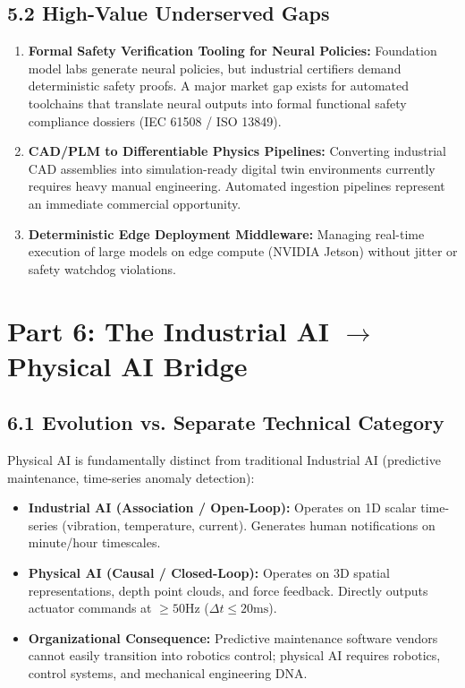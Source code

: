 \documentclass[11pt,a4paper]{article}
\begin{document}
\subsection{5.2 High-Value Underserved Gaps}
\begin{enumerate}
    \item \textbf{Formal Safety Verification Tooling for Neural Policies:} Foundation model labs generate neural policies, but industrial certifiers demand deterministic safety proofs. A major market gap exists for automated toolchains that translate neural outputs into formal functional safety compliance dossiers (IEC 61508 / ISO 13849).
    \item \textbf{CAD/PLM to Differentiable Physics Pipelines:} Converting industrial CAD assemblies into simulation-ready digital twin environments currently requires heavy manual engineering. Automated ingestion pipelines represent an immediate commercial opportunity.
    \item \textbf{Deterministic Edge Deployment Middleware:} Managing real-time execution of large models on edge compute (NVIDIA Jetson) without jitter or safety watchdog violations.
\end{enumerate}

\section{Part 6: The Industrial AI \texorpdfstring{$\rightarrow$}{to} Physical AI Bridge}

\subsection{6.1 Evolution vs. Separate Technical Category}
Physical AI is fundamentally distinct from traditional Industrial AI (predictive maintenance, time-series anomaly detection):
\begin{itemize}
    \item \textbf{Industrial AI (Association / Open-Loop):} Operates on 1D scalar time-series (vibration, temperature, current). Generates human notifications on minute/hour timescales.
    \item \textbf{Physical AI (Causal / Closed-Loop):} Operates on 3D spatial representations, depth point clouds, and force feedback. Directly outputs actuator commands at $\ge 50\text{Hz}$ ($\Delta t \le 20\text{ms}$).
    \item \textbf{Organizational Consequence:} Predictive maintenance software vendors cannot easily transition into robotics control; physical AI requires robotics, control systems, and mechanical engineering DNA.
\end{itemize}
\end{document}

